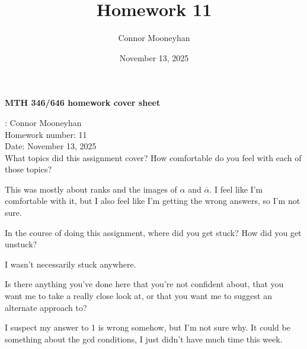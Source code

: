 \documentclass[12pt]{article}
\title{Homework 11}
\author{Connor Mooneyhan}
\date{November 13, 2025}
\theoremstyle{definition}
\begin{document}
\begin{center}
	{\bf\Large MTH 346/646 homework cover sheet}
\end{center}

\vspace{0.5in}

: Connor Mooneyhan \\
{\large Homework number}: 11 \\
{\large Date}: November 13, 2025 \\

{\Large What topics did this assignment cover? How comfortable do you feel with
each of those topics?}

This was mostly about ranks and the images of $\alpha$ and $\overline{\alpha}$.
I feel like I'm comfortable with it, but I also feel like I'm getting the wrong answers, so I'm not sure.

\vspace{1.75in}

{\Large In the course of doing this assignment, where did you get stuck?
	How did you get unstuck?}

  I wasn't necessarily stuck anywhere.


\vspace{1.75in}

{\Large Is there anything you've done here that you're not confident about, that you want me to take a really close look at, or that you want me to suggest an alternate approach to?}

I suspect my answer to 1 is wrong somehow, but I'm not sure why. It could be something about the gcd conditions, I just didn't have much time this week.

\pagebreak
\end{document}
